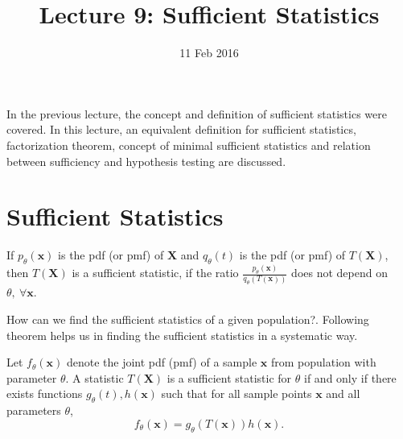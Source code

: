 \documentclass[a4paper,english,12pt]{article}
\title{Lecture 9: Sufficient Statistics}
\date{11 Feb 2016}
\author{}
\newcommand{\bx}{\mathbf{x}}
\newcommand{\bX}{\mathbf{X}}
\begin{document}
\maketitle
In the previous lecture, the concept and definition of sufficient statistics were covered. In this lecture, an equivalent definition for sufficient statistics, factorization theorem, concept of minimal sufficient statistics and relation between sufficiency and hypothesis testing are discussed.
\section{Sufficient Statistics}
\begin{defn} 
If $p_\theta(\bx)$ is the pdf (or pmf) of $\bX$ and $q_\theta(t)$ is the pdf (or pmf) of $T(\bX)$, then $T(\bX)$ is a sufficient statistic, if the ratio $\frac{p_\theta (\bx)}{q_\theta (T(\bx))}$ does not depend on $\theta,~ \forall \bx $.
\end{defn}
How can we find the sufficient statistics of a given population?. Following theorem helps us in finding the sufficient statistics in a systematic way.
\begin{thm}
 Let $f_\theta (\bx)$ denote the joint pdf (pmf) of a sample $\bx$ from population with parameter $\theta$. A statistic $T(\bX)$ is a sufficient statistic for $\theta$ if and only if there exists functions $g_\theta (t), h(\bx)$ such that for all sample points $\bx$ and all parameters $\theta$, 
\begin{equation}	\label{eq:thm1}
f_\theta(\bx)=g_\theta(T(\bx))h(\bx). 
\end{equation}
\end{thm}
\end{document}
